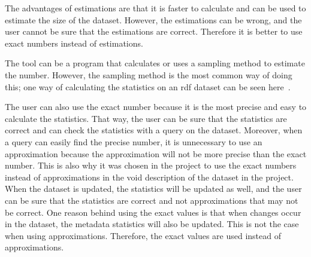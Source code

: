 The advantages of estimations are that it is faster to calculate and can be used to estimate the size of the dataset. However, the estimations can be wrong, and the user cannot be sure that the estimations are correct. Therefore it is better to use exact numbers instead of estimations.

The tool can be a program that calculates or uses a sampling method to estimate the number. However, the sampling method is the most common way of doing this; one way of calculating the statistics on an \gls{rdf} dataset can be seen here~\cite{zneika2016rdf}.

The user can also use the exact number because it is the most precise and easy to calculate the statistics. That way, the user can be sure that the statistics are correct and can check the statistics with a query on the dataset. Moreover, when a query can easily find the precise number, it is unnecessary to use an approximation because the approximation will not be more precise than the exact number.
This is also why it was chosen in the project to use the exact numbers instead of approximations in the \gls{void} description of the dataset in the project. When the dataset is updated, the statistics will be updated as well, and the user can be sure that the statistics are correct and not approximations that may not be correct. One reason behind using the exact values is that when changes occur in the dataset, the metadata statistics will also be updated. This is not the case when using approximations. Therefore, the exact values are used instead of approximations.




